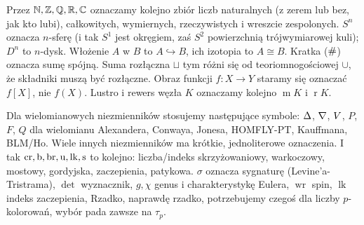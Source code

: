 
Przez $\mathbb N, \mathbb Z, \mathbb Q, \mathbb R, \mathbb C$ oznaczamy kolejno zbiór liczb naturalnych (z zerem lub bez, jak kto lubi), całkowitych, wymiernych, rzeczywistych i wreszcie zespolonych.
$S^n$ oznacza $n$-sferę (i tak $S^1$ jest okręgiem, zaś $S^2$ powierzchnią trójwymiarowej kuli); $D^n$ to $n$-dysk.
Włożenie $A$ w $B$ to $A \hookrightarrow B$, ich izotopia to $A \cong B$.
Kratka ($\mathbin{\#}$) oznacza sumę spójną.
Suma rozłączna $\sqcup$ tym różni się od teoriomnogościowej $\cup$, że składniki muszą być rozłączne. Obraz funkcji $f \colon X \to Y$ staramy się oznaczać $f[X]$, nie $f(X)$.
Lustro i rewers węzła $K$ oznaczamy kolejno $\operatorname{m} K$ i $\operatorname{r} K$.

Dla wielomianowych niezmienników stosujemy następujące symbole: $\Delta$, $\nabla$, $V$, $P$, $F$, $Q$ dla wielomianu Alexandera, Conwaya, Jonesa, HOMFLY-PT, Kauffmana, BLM/Ho.
Wiele innych niezmienników ma krótkie, jednoliterowe oznaczenia.
I tak $\operatorname{cr}, \operatorname{b}, \operatorname{br}, \operatorname{u}, \operatorname{lk}, \operatorname{s}$ to kolejno: liczba/indeks skrzyżowaniowy, warkoczowy, mostowy, gordyjska, zaczepienia, patykowa.
$\sigma$ oznacza sygnaturę (Levine'a-Tristrama), $\det$ wyznacznik, $g, \chi$ genus i charakterystykę Eulera, $\operatorname{wr}$ spin, $\operatorname{lk}$ indeks zaczepienia, 
Rzadko, naprawdę rzadko, potrzebujemy czegoś dla liczby $p$-kolorowań, wybór pada zawsze na $\tau_p$.


